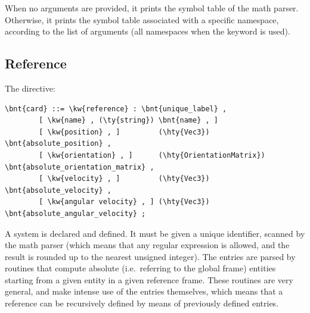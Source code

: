 When no arguments are provided, it prints the symbol table of the math parser.
Otherwise, it prints the symbol table associated with a specific namespace,
according to the list of arguments (all namespaces when the keyword  is used).



\subsection{Reference}
The  directive:
\begin{Verbatim}[commandchars=\\\{\}]
    \bnt{card} ::= \kw{reference} : \bnt{unique_label} , 
        [ \kw{name} , (\ty{string}) \bnt{name} , ]
        [ \kw{position} , ]         (\hty{Vec3}) \bnt{absolute_position} ,
        [ \kw{orientation} , ]      (\hty{OrientationMatrix}) \bnt{absolute_orientation_matrix} ,
        [ \kw{velocity} , ]         (\hty{Vec3}) \bnt{absolute_velocity} ,
        [ \kw{angular velocity} , ] (\hty{Vec3}) \bnt{absolute_angular_velocity} ;
\end{Verbatim}
A  system is declared and defined.
It must be given a unique identifier, scanned by the math parser
(which means that any regular expression is allowed, and the result is
rounded up to the nearest unsigned integer).
The entries  are parsed by routines that
compute absolute (i.e.\ referring to the global frame) entities
starting from a given entity in a given reference frame.
These routines are very general, and make intense use of the 
 entries themselves, which means that a reference 
can be recursively defined by means of previously defined 
 entries.

\bigskip

